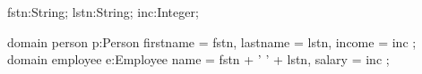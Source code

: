fstn:String;  lstn:String; inc:Integer;

domain person p:Person {
	firstname = fstn, lastname = lstn, income = inc
};
domain employee e:Employee {
	name = fstn + ' ' + lstn, salary = inc
};